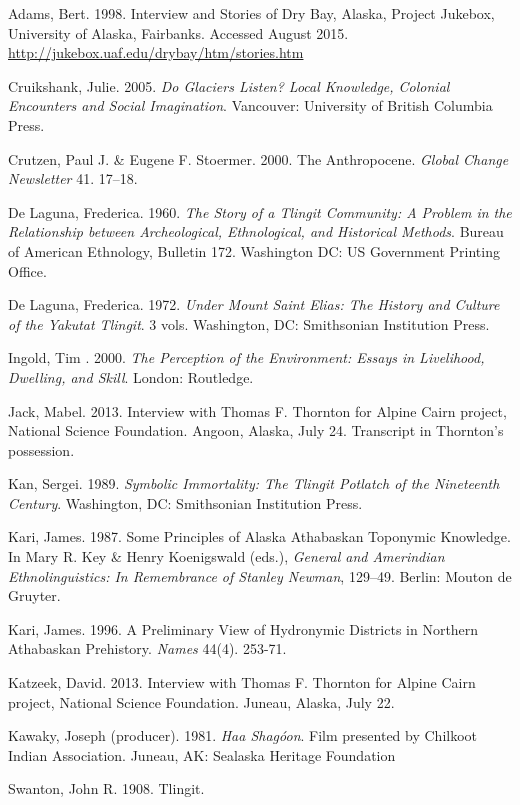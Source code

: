 \begin{hang}
Adams, Bert. 1998. Interview and Stories of Dry Bay, Alaska, Project Jukebox, University of Alaska, Fairbanks. Accessed August 2015. \url{http://jukebox.uaf.edu/drybay/htm/stories.htm}

Cruikshank, Julie. 2005. \textit{Do Glaciers Listen? Local Knowledge, Colonial Encounters and Social Imagination}. Vancouver: University of British Columbia Press.

Crutzen, Paul J. \& Eugene F. Stoermer.  2000. The Anthropocene. \textit{Global Change Newsletter} 41. 17–18.

De Laguna, Frederica. 1960. \textit{The Story of a Tlingit Community: A Problem in the Relationship between Archeological, Ethnological, and Historical Methods}. Bureau of American Ethnology, Bulletin 172. Washington DC: US Government Printing Office.

De Laguna, Frederica. 1972. \textit{Under Mount Saint Elias: The History and Culture of the Yakutat Tlingit}. 3 vols. Washington, DC: Smithsonian Institution Press.

Ingold, Tim . 2000. \textit{The Perception of the Environment: Essays in Livelihood, Dwelling, and Skill}. London: Routledge.

Jack, Mabel. 2013.  Interview with Thomas F. Thornton for Alpine Cairn project, National Science Foundation. Angoon, Alaska, July 24. Transcript in Thornton’s possession.

Kan, Sergei. 1989. \textit{Symbolic Immortality: The Tlingit Potlatch of the Nineteenth Century}. Washington, DC: Smithsonian Institution Press.

Kari, James. 1987. Some Principles of Alaska Athabaskan Toponymic Knowledge. In Mary R. Key \& Henry Koenigswald (eds.), \textit{General and Amerindian Ethnolinguistics: In Remembrance of Stanley Newman}, 129–49. Berlin: Mouton de Gruyter.

Kari, James. 1996. A Preliminary View of Hydronymic Districts in Northern Athabaskan Prehistory. \textit{Names}  44(4). 253-71.

Katzeek, David. 2013. Interview with Thomas F. Thornton for Alpine Cairn project, National Science Foundation. Juneau, Alaska, July 22.

Kawaky, Joseph (producer). 1981. \textit{Haa Shagóon}. Film presented by Chilkoot Indian Association. Juneau, AK: Sealaska Heritage Foundation

Swanton, John R. 1908. Tlingit.  


\end{hang}
